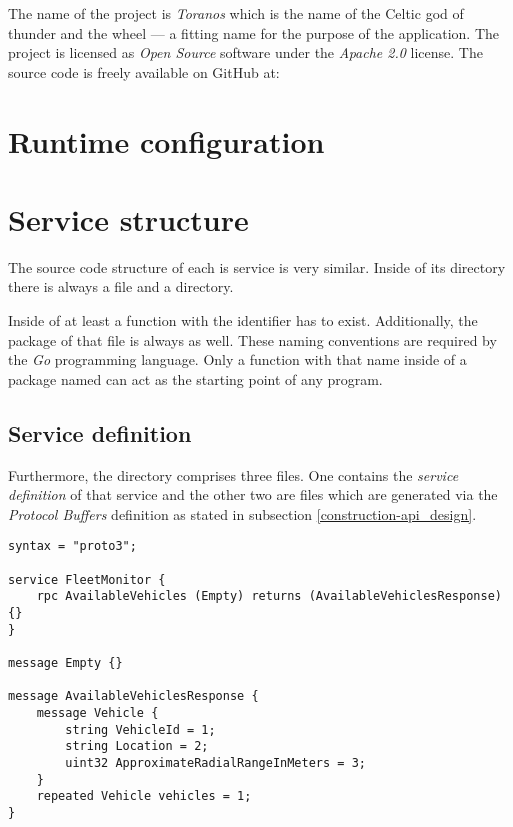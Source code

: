\documentclass[12pt,a4paper,twoside]{report}
\begin{document}
The name of the project is \textit{Toranos} which is the name of the
Celtic god of thunder and the wheel --- a fitting name for the purpose of the application.
The project is licensed as \textit{Open Source} software under the
\textit{Apache 2.0} license. The source code is freely available on GitHub at:\\


\section{Runtime configuration}




\section{Service structure}

The source code structure of each is service is very similar.
Inside of its directory there is always a  file and a 
directory.

Inside of  at least a function with the identifier
 has to exist. Additionally, the package of that file is always
 as well. These naming conventions are required by the
\textit{Go} programming language. Only a function with that name inside of
a package named  can act as the starting point of any program.

\subsection{Service definition} \label{subsect:service-definition}
Furthermore, the  directory comprises three files.
One contains the \textit{service definition} of that service and the other
two are  files which are generated via the \textit{Protocol Buffers}
definition as stated in subsection \ref{construction-api_design}.

\begin{lstlisting}[title=services/fleet-monitor/proto/fleet-monitor.proto, language=protobuf3]
syntax = "proto3";

service FleetMonitor {
    rpc AvailableVehicles (Empty) returns (AvailableVehiclesResponse) {}
}

message Empty {}

message AvailableVehiclesResponse {
    message Vehicle {
        string VehicleId = 1;
        string Location = 2;
        uint32 ApproximateRadialRangeInMeters = 3;
    }
    repeated Vehicle vehicles = 1;
}
\end{lstlisting}
\end{document}
